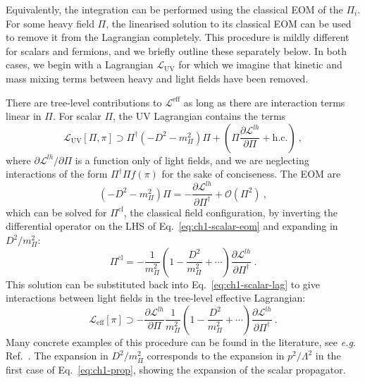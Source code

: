 Equivalently, the integration can be performed using the classical EOM of the
$\Pi_{i}$. For some heavy field $\Pi$, the linearised solution to its classical
EOM can be used to remove it from the Lagrangian completely. This procedure is
mildly different for scalars and fermions, and we briefly outline these
separately below. In both cases, we begin with a Lagrangian
$\mathscr{L}_{\text{UV}}$ for which we imagine that kinetic and mass mixing
terms between heavy and light fields have been removed.

There are tree-level contributions to $\mathscr{L}^{\text{eff}}$ as long as
there are interaction terms linear in $\Pi$. For scalar $\Pi$, the UV Lagrangian
contains the terms
\begin{equation}
  \label{eq:ch1-scalar-lag}
 \mathscr{L}_{\text{UV}}[\Pi, \pi] \supset \Pi^{\dagger} (- D^{2} - m_{\Pi}^{2}) \Pi + \left(\Pi \frac{\partial \mathscr{L}^{lh}}{\partial \Pi} + \text{h.c.} \right) \ ,
\end{equation}
where $\partial \mathscr{L}^{lh} / \partial \Pi$ is a function only of
light fields, and we are neglecting interactions of the form
$\Pi^{\dagger} \Pi f(\pi)$ for the sake of conciseness. The EOM are
\begin{equation}
  \label{eq:ch1-scalar-eom}
 (- D^{2} - m_{\Pi}^{2}) \Pi = - \frac{\partial \mathscr{L}^{lh}}{\partial \Pi^{\dagger}} + \mathcal{O}(\Pi^{2}) \ ,
\end{equation}
which can be solved for $\Pi^{\text{cl}}$, the classical field configuration, by
inverting the differential operator on the LHS of Eq.~\eqref{eq:ch1-scalar-eom} and
expanding in $D^{2} / m_{\Pi}^{2}$:
\begin{equation}
  \label{eq:ch1-scalar-repl}
  \Pi^{\text{cl}} = - \frac{1}{m_{\Pi}^{2}} \left( 1 - \frac{D^{2}}{m_{\Pi}^{2}}  + \cdots \right) \frac{\partial \mathscr{L}^{lh}}{\partial \Pi^{\dagger}} \ .
\end{equation}
This solution can be substituted back into Eq.~\eqref{eq:ch1-scalar-lag} to give
interactions between light fields in the tree-level effective Lagrangian:
\begin{equation}
  \label{eq:ch1-classical-efflag-scalar}
  \mathscr{L}_{\text{eff}}[\pi] \supset - \frac{\partial \mathscr{L}^{lh}}{\partial \Pi} \frac{1}{m_{\Pi}^{2}} \left( 1 - \frac{D^{2}}{m_{\Pi}^{2}} + \cdots \right) \frac{\partial \mathscr{L}^{lh}}{\partial \Pi^{\dagger}} \ .
\end{equation}
Many concrete examples of this procedure can be found in the literature, see
\textit{e.g.} Ref.~\cite{Henning:2014wua}. The expansion in $D^{2}/m_{\Pi}^{2}$
corresponds to the expansion in $p^{2} / \Lambda^{2}$ in the first case of
Eq.~\eqref{eq:ch1-prop}, showing the expansion of the scalar propagator.

